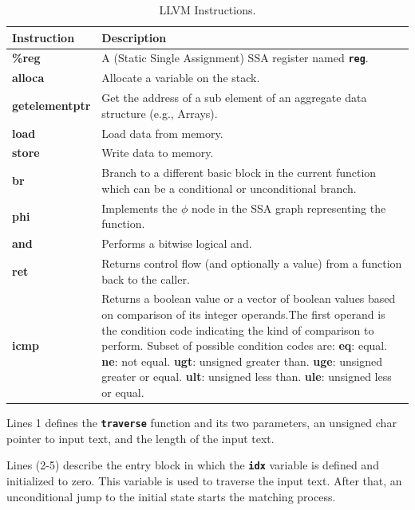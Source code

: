 {\renewcommand{\arraystretch}{1.5}%
\begin{table}[H]
\centering
\small
\begin{tabularx}{\textwidth}{|l|X|}
\hline
Instruction        & Description  \\
\hline
\textbf{\%reg} & A (Static Single Assignment) SSA register named \texttt{\textbf{reg}}.\\
\hline
\textbf{alloca} & Allocate a variable on the stack.\\
\hline
\textbf{getelementptr} & Get the address of a sub element of an aggregate data structure (e.g., Arrays).\\
\hline
\textbf{load} & Load data from memory.\\
\hline
\textbf{store} & Write data to memory.\\
\hline
\textbf{br} & Branch to a different basic block in the current function which can be a conditional or unconditional branch. \\
\hline
\textbf{phi} & Implements the $\phi$ node in the SSA graph representing the function.\\
\hline
\textbf{and} & Performs a bitwise logical and.\\
\hline
\textbf{ret} & Returns control flow (and optionally a value) from a function back to the caller.\\
\hline
\textbf{icmp} &
Returns a boolean value or a vector of boolean values based on comparison of its integer operands.The first operand is the condition code indicating the kind of comparison to perform. Subset of possible condition codes are:\newline
\textbf{eq}: equal. \textbf{ne}: not equal. \textbf{ugt}: unsigned greater than.
\textbf{uge}: unsigned greater or equal. \textbf{ult}: unsigned less than. \textbf{ule}: unsigned less or equal.\\
\hline
\end{tabularx}
\caption[LLVM Instructions]{LLVM Instructions.}\label{tab:llvminst}
\end{table}}

Lines 1 defines the \texttt{\textbf{traverse}} function and its two parameters, an unsigned char pointer to input text, and the length of the input text.

Lines (2-5) describe the entry block in which the \texttt{\textbf{idx}} variable is defined and initialized to zero. This variable is used to traverse the input text. After that, an unconditional jump to the initial state starts the matching process.

